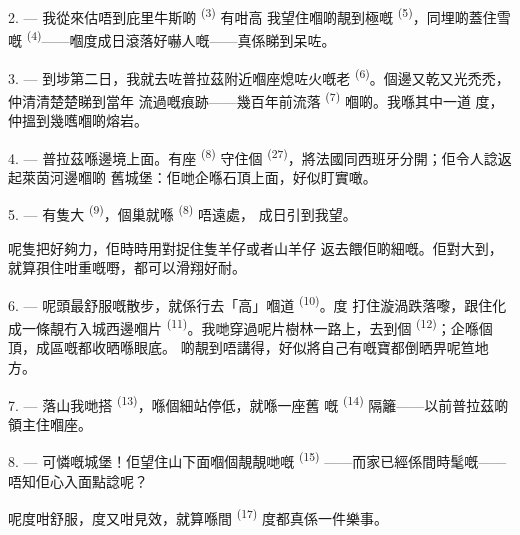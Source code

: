 2. --- 我從來估唔到庇里牛斯啲 \textsuperscript{(3)} 有咁高
我望住嗰啲靚到極嘅 \textsuperscript{(5)}，同埋啲蓋住雪嘅
 \textsuperscript{(4)}——嗰度成日滾落好嚇人嘅——真係睇到呆咗。

\VUsaut{3.0mm}
\VUsaut{3.0mm}

3. --- 到埗第二日，我就去咗普拉茲附近嗰座熄咗火嘅老
\textsuperscript{(6)}。個邊又乾又光禿禿，仲清清楚楚睇到當年
流過嘅痕跡——幾百年前流落 \textsuperscript{(7)} 嗰啲。我喺其中一道
度，仲搵到幾嚿嗰啲熔岩。

4. --- 普拉茲喺邊境上面。有座 \textsuperscript{(8)} 守住個
 \textsuperscript{(27)}，將法國同西班牙分開；佢令人諗返起萊茵河邊嗰啲
舊城堡：佢哋企喺石頂上面，好似盯實噉。

5. --- 有隻大 \textsuperscript{(9)}，個巢就喺 \textsuperscript{(8)} 唔遠處，
成日引到我望。

呢隻把好夠力，佢時時用對捉住隻羊仔或者山羊仔
返去餵佢啲細嘅。佢對大到，就算孭住咁重嘅嘢，都可以滑翔好耐。

\VUsaut{3.0mm}
\VUsaut{3.0mm}

6. --- 呢頭最舒服嘅散步，就係行去「高」嗰道 \textsuperscript{(10)}。度
打住漩渦跌落嚟，跟住化成一條靚冇入城西邊嗰片
 \textsuperscript{(11)}。我哋穿過呢片樹林一路上，去到個
\textsuperscript{(12)}；企喺個頂，成區嘅都收晒喺眼底。
啲靚到唔講得，好似將自己有嘅寶都倒晒畀呢笪地方。

7. --- 落山我哋搭 \textsuperscript{(13)}，喺個細站停低，就喺一座舊
嘅 \textsuperscript{(14)} 隔籬——以前普拉茲啲領主住嗰座。

8. --- 可憐嘅城堡！佢望住山下面嗰個靚靚哋嘅 \textsuperscript{(15)}
——而家已經係間時髦嘅——唔知佢心入面點諗呢？

呢度咁舒服，度又咁見效，就算喺間
\textsuperscript{(17)} 度都真係一件樂事。

